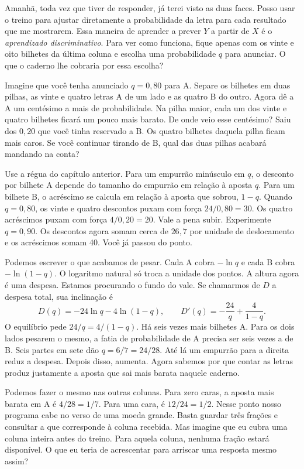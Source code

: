 Amanhã, toda vez que tiver de responder, já terei visto as duas faces. Posso usar o treino para ajustar diretamente a probabilidade da letra para cada resultado que me mostrarem. Essa maneira de aprender a prever $Y$ a partir de $X$ é o \emph{aprendizado discriminativo}. Para ver como funciona, fique apenas com os vinte e oito bilhetes da última coluna e escolha uma probabilidade $q$ para anunciar. O que o caderno lhe cobraria por essa escolha?

Imagine que você tenha anunciado $q=0{,}80$ para A. Separe os bilhetes em duas pilhas, as vinte e quatro letras A de um lado e as quatro B do outro. Agora dê a A um centésimo a mais de probabilidade. Na pilha maior, cada um dos vinte e quatro bilhetes ficará um pouco mais barato. De onde veio esse centésimo? Saiu dos $0{,}20$ que você tinha reservado a B. Os quatro bilhetes daquela pilha ficam mais caros. Se você continuar tirando de B, qual das duas pilhas acabará mandando na conta?

Use a régua do capítulo anterior. Para um empurrão minúsculo em $q$, o desconto por bilhete A depende do tamanho do empurrão em relação à aposta $q$. Para um bilhete B, o acréscimo se calcula em relação à aposta que sobrou, $1-q$. Quando $q=0{,}80$, os vinte e quatro descontos puxam com força $24/0{,}80=30$. Os quatro acréscimos puxam com força $4/0{,}20=20$. Vale a pena subir. Experimente $q=0{,}90$. Os descontos agora somam cerca de $26{,}7$ por unidade de deslocamento e os acréscimos somam 40. Você já passou do ponto.

Podemos escrever o que acabamos de pesar. Cada A cobra $-\ln q$ e cada B cobra $-\ln(1-q)$. O logaritmo natural só troca a unidade dos pontos. A altura agora é uma despesa. Estamos procurando o fundo do vale. Se chamarmos de $D$ a despesa total, sua inclinação é
\[
 D(q)=-24\ln q-4\ln(1-q),\qquad
 D'(q)=-\frac{24}{q}+\frac{4}{1-q}.
\]
O equilíbrio pede $24/q=4/(1-q)$. Há seis vezes mais bilhetes A. Para os dois lados pesarem o mesmo, a fatia de probabilidade de A precisa ser seis vezes a de B. Seis partes em sete dão $q=6/7=24/28$. Até lá um empurrão para a direita reduz a despesa. Depois disso, aumenta. Agora sabemos por que contar as letras produz justamente a aposta que sai mais barata naquele caderno.

Podemos fazer o mesmo nas outras colunas. Para zero caras, a aposta mais barata em A é $4/28=1/7$. Para uma cara, é $12/24=1/2$. Nesse ponto nosso programa cabe no verso de uma moeda grande. Basta guardar três frações e consultar a que corresponde à coluna recebida. Mas imagine que eu cubra uma coluna inteira antes do treino. Para aquela coluna, nenhuma fração estará disponível. O que eu teria de acrescentar para arriscar uma resposta mesmo assim?


